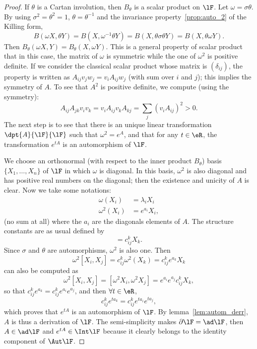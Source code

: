 \begin{proof}
If $\theta$ is a Cartan involution, then $B_{\theta}$ is a scalar product on $\lF$. Let $\omega=\sigma\theta$. By using $\sigma^2=\theta^2=1$, $\theta=\theta^{-1}$ and the invariance property~\ref{prop:auto_2} of the Killing form,
\begin{equation}
B(\omega X,\theta Y)=B(X,\omega^{-1}\theta Y)
                    =B(X,\theta\sigma\theta Y)
            =B(X,\theta\omega Y).
\end{equation}
Then $B_{\theta}(\omega X,Y)=B_{\theta}(X,\omega Y)$. This is a general property of scalar product that in this case, the matrix of $\omega$ is symmetric while the one of $\omega^2$ is positive definite. If we consider the classical scalar product whose matrix is $(\delta_{ij})$, the property is written as $A_{ij}v_jw_j=v_iA_{ij}w_j$ (with sum over $i$ and $j$); this implies the symmetry of $A$. To see that $A^2$ is positive definite, we compute (using the symmetry):
\[
   A_{ij}A_{jk}v_iv_k=v_iA_{ij}v_kA_{kj}=\sum_j(v_iA_{ij})^2>0.
\]
The next step is to see that there is an unique linear transformation $\dpt{A}{\lF}{\lF}$ such that $\omega^2=e^A$, and that for any $t\in\eR$, the transformation $e^{tA}$ is an automorphism of $\lF$.

We choose an orthonormal (with respect to the inner product $B_{\theta}$) basis $\{X_1,\ldots,X_n\}$  of $\lF$ in which $\omega$ is diagonal. In this basis, $\omega^2$ is also diagonal and has positive real numbers on the diagonal; then the existence and unicity of $A$ is clear. Now we take some notations:
\begin{subequations}
\begin{align}
  \omega(X_i)&=\lambda_iX_i\\
  \omega^2(X_i)&=e^{a_i}X_i,
\end{align}
\end{subequations}
(no sum at all) where the $a_i$ are the diagonals elements of $A$. The structure constants are as usual defined by
\begin{equation}
   [X_i,X_j]=c_{ij}^kX_k.
\end{equation}
Since $\sigma$ and $\theta$ are automorphisms, $\omega^2$ is also one. Then
\[
\omega^2[X_i,X_j]=c_{ij}^k\omega^2(X_k)=c_{ij}^ke^{a_k}X_k
\]
can also be computed as
\[
   \omega^2[X_i,X_j]=[\omega^2X_i,\omega^2X_j]=e^{a_i}e^{a_j}c_{ij}^kX_k,
\]
so that $c_{ij}^ke^{a_k}=c_{ij}^ke^{a_i}e^{a_j}$, and then $\forall t\in\eR$,
\[
   c_{ij}^ke^{ta_k}=c_{ij}^ke^{ta_i}e^{ta_j},
\]
which proves that $e^{tA}$ is an automorphism of $\lF$. By lemma~\ref{lem:autom_derr}, $A$ is thus a derivation of $\lF$. The semi-simplicity makes $\partial\lF=\ad\lF$, then $A\in\ad\lF$ and $e^{tA}\in\Int\lF$ because it clearly belongs to the identity component of $\Aut\lF$.


\end{proof}
